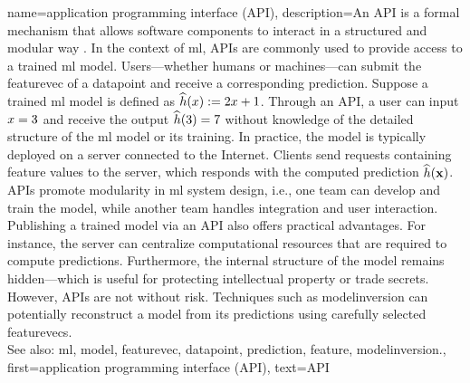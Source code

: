 {name={application programming interface (API)},
		description={An  API is a formal mechanism that 
			allows software components to interact in a structured and modular way \cite{RestfulBook2013}.
			In the context of \gls{ml}, APIs are commonly used to provide access to a trained \gls{ml} \gls{model}. 
			Users—whether humans or machines—can submit the \gls{featurevec} of a \gls{datapoint} and receive 
			a corresponding \gls{prediction}. Suppose a trained \gls{ml} \gls{model} is defined 
			as $\widehat{h}(x) := 2 x + 1$. Through an API, a user 
			can input $x = 3$ and receive the output $\widehat{h}(3) = 7$ 
			without knowledge of the detailed structure of the \gls{ml} \gls{model} or its training. 
			In practice, the \gls{model} is typically deployed on a server connected to the Internet. 
			Clients send requests containing \gls{feature} values to the server, which responds with 
			the computed \gls{prediction} $\widehat{h}({\bf x})$. APIs promote modularity 
			in \gls{ml} system design, i.e., one team can develop and train the \gls{model}, while another team
			handles integration and user interaction. Publishing a trained \gls{model} via an API also 
			offers practical advantages. For instance, the server can centralize computational resources that 
			are required to compute \glspl{prediction}. Furthermore, the internal structure of the \gls{model} remains 
			hidden—which is useful for protecting intellectual property or trade secrets. 
			However, APIs are not without \gls{risk}. Techniques such as \gls{modelinversion} can potentially reconstruct a 
			\gls{model} from its \glspl{prediction} using carefully selected \glspl{featurevec}.
					\\
			See also: \gls{ml}, \gls{model}, \gls{featurevec}, \gls{datapoint}, \gls{prediction}, \gls{feature}, \gls{modelinversion}.},
		first={application programming interface (API)},
		text={API}
}

